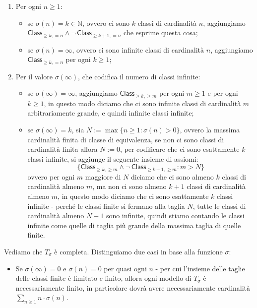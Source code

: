\begin{soln}
    \begin{enumerate}
        \item Per ogni $n \geq 1$:
        \begin{itemize}
            \item se $\sigma(n) = k \in \mathbb{N}$, ovvero ci sono $k$ classi di cardinalità $n$, aggiungiamo $\mathsf{Class}_{\geq k, = n} \land \neg\, \mathsf{Class}_{\geq k+1, = n}$ che esprime questa cosa;
            \item se $\sigma(n) = \infty$, ovvero ci sono infinite classi di cardinalità $n$, aggiungiamo $\mathsf{Class}_{\geq k, = n}$ per ogni $k \geq 1$;
        \end{itemize}
        \item Per il valore $\sigma(\infty)$, che codifica il numero di classi infinite:
        \begin{itemize}
            \item se $\sigma(\infty) = \infty$, aggiungiamo $\mathsf{Class}_{\geq k, \geq m}$ per ogni $m \geq 1$ e per ogni $k \geq 1$, in questo modo diciamo che ci sono infinite classi di cardinalità $m$ arbitrariamente grande, e quindi infinite classi infinite;
            \item se $\sigma(\infty) = k$, sia $N := \max\{n \geq 1 : \sigma(n) > 0\}$\purple{$^*$}, ovvero la massima cardinalità finita di classe di equivalenza, se non ci sono classi di cardinalità finita allora $N := 0$,
            per codificare che ci sono esattamente $k$ classi infinite, si aggiunge il seguente insieme di assiomi:
            \[ \{\mathsf{Class}_{\geq k, \geq m} \land \neg\, \mathsf{Class}_{\geq k+1, \geq m} : m > N\} \]
            ovvero per ogni $m$ maggiore di $N$ diciamo che ci sono almeno $k$ classi di cardinalità almeno $m$, ma non ci sono almeno $k+1$ classi di cardinalità almeno $m$, in questo modo diciamo che ci sono esattamente $k$ classi infinite - perché le classi finite si fermano 
            alla taglia $N$, tutte le classi di cardinalità almeno $N+1$ sono infinite, quindi stiamo contando le classi infinite come quelle di taglia più grande della massima taglia di quelle finite.
        \end{itemize}
    \end{enumerate}
    Vediamo che $T_{\sigma}$ è completa. Distinguiamo due casi in base alla funzione $\sigma$:
    \begin{itemize}
        \item Se $\sigma(\infty) = 0$ e $\sigma(n) = 0$ per quasi ogni $n$ - per cui l'insieme delle taglie delle classi finite è limitato e finito, allora ogni modello di $T_{\sigma}$ è necessariamente finito, in particolare dovrà avere necessariamente cardinalità $\sum_{n \geq 1} n \cdot \sigma(n)$.

\end{itemize}
\end{soln}
